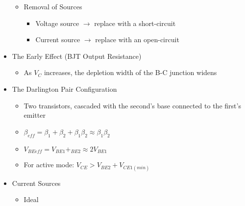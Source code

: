 \begin{itemize}
\begin{itemize}
\begin{itemize}
        \end{itemize}

      \item Removal of Sources

        \begin{itemize}

          \item Voltage source $\to$ replace with a short-circuit

          \item Current source $\to$ replace with an open-circuit

        \end{itemize}

    \end{itemize}

  \item The Early Effect (BJT Output Resistance)

    \begin{itemize}

      \item As $V_C$ increases, the depletion width of the B-C junction widens

    \end{itemize}

  \item The Darlington Pair Configuration

    \begin{itemize}

      \item Two transistors, cascaded with the second's base connected to the first's emitter

      \item $\beta_{eff}=\beta_1+\beta_2+\beta_1\beta_2\approx \beta_1\beta_2$

      \item $V_{BEeff}=V_{BE1}+_{BE2}\approx 2V_{BE1}$

      \item For active mode: $V_{CE}>V_{BE2}+V_{CE1(min)}$

    \end{itemize}

  \item Current Sources

    \begin{itemize}

      \item Ideal

        \begin{itemize}


\end{itemize}
\end{itemize}
\end{itemize}
